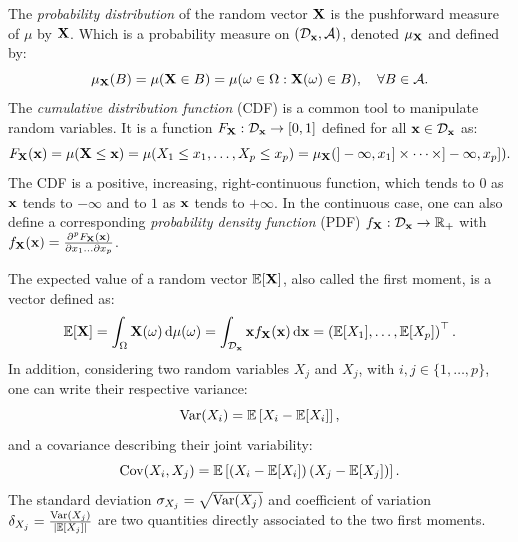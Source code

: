The \textit{probability distribution} of the random vector ${\bf X}$ is the pushforward measure of $\mu$ by ${\bf X}$.
Which is a probability measure on $(\mathcal{D}_{{\bf x}}, \mathcal{A})$, denoted $\mu_{{\bf X}}$ and defined by: 
\begin{equation}
    \mu_{{\bf X}}(B) = \mu({\bf X} \in B) = \mu(\omega \in \Omega : {\bf X}(\omega)\in B), \quad \forall B \in \mathcal{A}.
\end{equation}
The \textit{cumulative distribution function} (CDF) is a common tool to manipulate random variables. 
It is a function $F_{{\bf X}} : \mathcal{D}_{{\bf x}} \rightarrow [0, 1]$ defined for all ${\bf x} \in \mathcal{D}_{{\bf x}}$ as: 
\begin{equation}
    F_{{\bf X}}({\bf x}) = \mu({\bf X} \leq {\bf x})
            = \mu(X_1 \leq x_1, \dots, X_p \leq x_p)
            = \mu_{{\bf X}}(]-\infty, x_1] \times \dots \times ]-\infty, x_p]).
\end{equation}
The CDF is a positive, increasing, right-continuous function, which tends to $0$ as ${\bf x}$ tends to $-\infty$ and to $1$ as ${\bf x}$ tends to $+\infty$.
In the continuous case, one can also define a corresponding \textit{probability density function} (PDF) $f_{{\bf X}}: \mathcal{D}_{{\bf x}} \rightarrow \mathbb{R}_+$  with 
$f_{{\bf X}}({\bf x}) = \frac{\partial^p F_{{\bf X}}({\bf x})}{\partial x_1 \dots \partial x_p}$.

The expected value of a random vector $\mathbb{E}[{\bf X}]$, also called the first moment, is a vector defined as:
\begin{equation}
    \mathbb{E}[{\bf X}] = \int_{\Omega} {\bf X}(\omega) \,\mathrm{d} \mu(\omega) =  \int_{\mathcal{D}_{{\bf x}}} {\bf x} f_{{\bf X}}({\bf x}) \, \mathrm{d}{\bf x} = \left(\mathbb{E}[X_1], \dots, \mathbb{E}[X_p]\right)^\top.
\end{equation}
In addition, considering two random variables $X_j$ and $X_j$, with $i, j \in \{1, \dots, p\}$, one can write their respective variance:
\begin{equation}
    \operatorname{Var}(X_i) = \mathbb{E}\left[X_i - \mathbb{E}[X_i]\right],
\end{equation}
and a covariance describing their joint variability:
\begin{equation}
    \operatorname{Cov}(X_i, X_j) = \mathbb{E}\left[\left(X_i - \mathbb{E}[X_i]\right) \left(X_j - \mathbb{E}[X_j]\right)\right].
\end{equation}
The standard deviation $\sigma_{X_j} = \sqrt{\operatorname{Var}(X_j)}$ and coefficient of variation $\delta_{X_j} = \frac{\operatorname{Var}(X_j)}{|\mathbb{E}[X_j]|}$ are two quantities directly associated to the two first moments.



